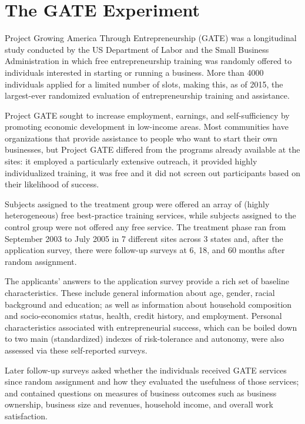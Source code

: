 
\section{The GATE Experiment}

Project Growing America Through Entrepreneurship (GATE) was a longitudinal study conducted by the US Department of Labor and the Small Business Administration in which free entrepreneurship training was randomly offered to individuals interested in starting or running a business. More than 4000 individuals applied for a limited number of slots, making this, as of 2015, the largest-ever randomized evaluation of entrepreneurship training and assistance.

Project GATE sought to increase employment, earnings, and self-sufficiency by promoting economic development in low-income areas. Most communities have organizations that provide assistance to people who want to start their own businesses, but Project GATE differed from the programs already available at the sites: it employed a particularly extensive outreach, it provided highly individualized training, it was free and it did not screen out participants based on their likelihood of success.

Subjects assigned to the treatment group were offered an array of (highly heterogeneous) free best-practice training services, while subjects assigned to the control group were not offered any free service. The treatment phase ran from September 2003 to July 2005 in 7 different sites across 3 states and, after the application survey, there were follow-up surveys at 6, 18, and 60 months after random assignment.

The applicants' answers to the application survey provide a rich set of baseline characteristics. These include general information about age, gender, racial background and education; as well as information about household composition and socio-economics status, health, credit history, and employment. Personal characteristics associated with entrepreneurial success, which can be boiled down to two main (standardized) indexes of risk-tolerance and autonomy, were also assessed via these self-reported surveys.

Later follow-up surveys asked whether the individuals received GATE services since random assignment and how they evaluated the usefulness of those services; and contained questions on measures of business outcomes such as business ownership, business size and revenues, household income, and overall work satisfaction.

